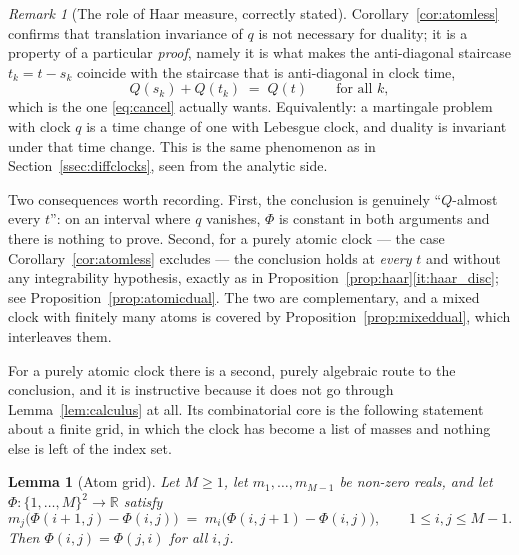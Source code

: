 \documentclass[11pt,a4paper]{article}
\theoremstyle{plain}
\newtheorem{lemma}[theorem]{Lemma}
\theoremstyle{definition}
\theoremstyle{remark}
\newtheorem{remark}[theorem]{Remark}
\newcommand{\R}{\mathbb{R}}
\begin{document}
\begin{remark}[The role of Haar measure, correctly stated]
  \label{rem:haarrole}
  Corollary~\ref{cor:atomless} confirms that translation invariance of $q$ is not
  necessary for duality; it is a property of a particular \emph{proof}, namely it is what
  makes the anti-diagonal staircase $t_k = t - s_k$ coincide with the staircase
  that is anti-diagonal in clock time,
  \[
    Q(s_k) + Q(t_k) \;=\; Q(t) \qquad \text{for all } k ,
  \]
  which is the one \eqref{eq:cancel} actually wants.  Equivalently: a martingale
  problem with clock $q$ is a time change of one with Lebesgue clock, and duality
  is invariant under that time change.  This is the same phenomenon as in
  Section~\ref{ssec:diffclocks}, seen from the analytic side.

  Two consequences worth recording.  First, the conclusion is genuinely
  ``$Q$-almost every $t$'': on an interval where $q$ vanishes, $\Phi$ is constant
  in both arguments and there is nothing to prove.  Second, for a purely atomic
  clock --- the case Corollary~\ref{cor:atomless} excludes --- the conclusion
  holds at \emph{every} $t$ and without any integrability hypothesis, exactly as
  in Proposition~\ref{prop:haar}\ref{it:haar_disc}; see
  Proposition~\ref{prop:atomicdual}.  The two are complementary, and a mixed
  clock with finitely many atoms is covered by
  Proposition~\ref{prop:mixeddual}, which interleaves them.
\end{remark}

For a purely atomic clock there is a second, purely algebraic route to the
conclusion, and it is instructive because it does not go through
Lemma~\ref{lem:calculus} at all.  Its combinatorial core is the following
statement about a finite grid, in which the clock has become a list of masses and
nothing else is left of the index set.

\begin{lemma}[Atom grid]
  \label{lem:atomgrid}
  Let $M \geq 1$, let $m_1,\dots,m_{M-1}$ be non-zero reals, and let
  $\Phi : \{1,\dots,M\}^2 \to \R$ satisfy
  \begin{equation}
    \label{eq:atomgrid}
    m_j \bigl( \Phi(i{+}1,j) - \Phi(i,j) \bigr)
      \;=\; m_i \bigl( \Phi(i,j{+}1) - \Phi(i,j) \bigr) ,
    \qquad 1 \leq i,j \leq M-1 .
  \end{equation}
  Then $\Phi(i,j) = \Phi(j,i)$ for all $i,j$.
\end{lemma}
\end{document}
